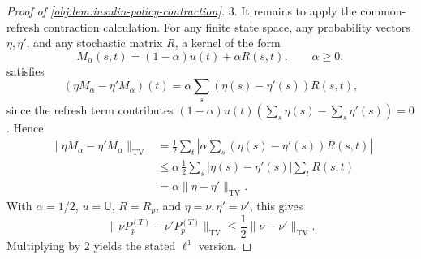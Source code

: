 \documentclass[11pt]{article}
\begin{document}
\begin{proof}[Proof of \cref{obj:lem:insulin-policy-contraction}]
3. It remains to apply the common-refresh contraction calculation.  For any
finite state space, any probability vectors \(\eta,\eta'\), and any stochastic
matrix \(R\), a kernel of the form
\[
M_\alpha(s,t)=(1-\alpha)u(t)+\alpha R(s,t),
\qquad \alpha\ge 0,
\]
satisfies
\[
(\eta M_\alpha-\eta'M_\alpha)(t)
=
\alpha\sum_s(\eta(s)-\eta'(s))R(s,t),
\]
since the refresh term contributes
\((1-\alpha)u(t)(\sum_s\eta(s)-\sum_s\eta'(s))=0\).  Hence
\[
\begin{aligned}
\|\eta M_\alpha-\eta'M_\alpha\|_{\mathrm{TV}}
&=
\frac12\sum_t
\left|
\alpha\sum_s(\eta(s)-\eta'(s))R(s,t)
\right|  \\
&\le
\alpha\,\frac12\sum_s|\eta(s)-\eta'(s)|
        \sum_t R(s,t) \\
&=
\alpha\|\eta-\eta'\|_{\mathrm{TV}} .
\end{aligned}
\]
With \(\alpha=1/2\), \(u=\mathsf U\), \(R=R_p\), and
\(\eta=\nu,\eta'=\nu'\), this gives
\[
\|\nu P_p^{(T)}-\nu'P_p^{(T)}\|_{\mathrm{TV}}
\le
\frac12\|\nu-\nu'\|_{\mathrm{TV}} .
\]
Multiplying by \(2\) yields the stated \(\ell^1\) version.
\end{proof}
\end{document}
